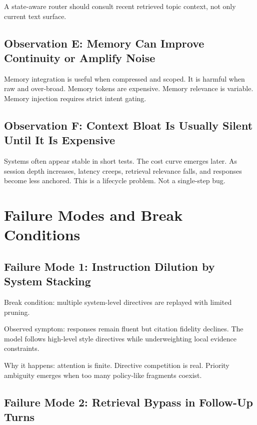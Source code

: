 \documentclass[conference]{IEEEtran}
\begin{document}
A state-aware router should consult recent retrieved topic context,
not only current text surface.

\subsection{Observation E: Memory Can Improve Continuity or Amplify Noise}

Memory integration is useful when compressed and scoped.
It is harmful when raw and over-broad.
Memory tokens are expensive.
Memory relevance is variable.
Memory injection requires strict intent gating.

\subsection{Observation F: Context Bloat Is Usually Silent Until It Is Expensive}

Systems often appear stable in short tests.
The cost curve emerges later.
As session depth increases,
latency creeps,
retrieval relevance falls,
and responses become less anchored.
This is a lifecycle problem.
Not a single-step bug.

\section{Failure Modes and Break Conditions}
\label{sec:failures}

\subsection{Failure Mode 1: Instruction Dilution by System Stacking}

Break condition:
multiple system-level directives are replayed with limited pruning.

Observed symptom:
responses remain fluent but citation fidelity declines.
The model follows high-level style directives while underweighting local evidence constraints.

Why it happens:
attention is finite.
Directive competition is real.
Priority ambiguity emerges when too many policy-like fragments coexist.

\subsection{Failure Mode 2: Retrieval Bypass in Follow-Up Turns}
\end{document}
